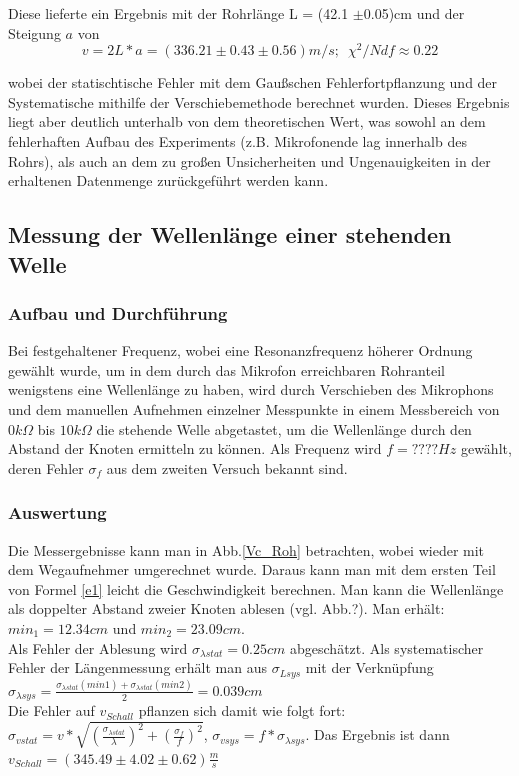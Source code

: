 \documentclass[]{article}
\begin{document}
	Diese lieferte ein Ergebnis mit der Rohrlänge L = (42.1 $\pm$0.05)cm und der Steigung $a$ von 
	\begin{equation}
		v = 2L*a = (336.21 \pm 0.43 \pm 0.56) m/s; \, \, \, \chi^2/Ndf \approx 0.22
	\end{equation}
	
	wobei der statischtische Fehler mit dem Gaußschen Fehlerfortpflanzung und der Systematische mithilfe der Verschiebemethode berechnet wurden. Dieses Ergebnis liegt aber deutlich unterhalb von dem theoretischen Wert, was sowohl an dem fehlerhaften Aufbau des Experiments (z.B. Mikrofonende lag innerhalb des Rohrs), als auch an dem zu großen Unsicherheiten und Ungenauigkeiten in der erhaltenen Datenmenge zurückgeführt werden kann.
	
	\subsection{Messung der Wellenlänge einer stehenden Welle}
	\subsubsection{Aufbau und Durchführung}
	Bei festgehaltener Frequenz, wobei eine Resonanzfrequenz höherer Ordnung gewählt wurde, um in dem durch das Mikrofon erreichbaren Rohranteil wenigstens eine Wellenlänge zu haben, wird durch Verschieben des Mikrophons und dem manuellen Aufnehmen einzelner Messpunkte in einem Messbereich von $0k\Omega$ bis $10k\Omega$ die stehende Welle abgetastet, um die Wellenlänge durch den Abstand der Knoten ermitteln zu können. Als Frequenz wird $f=????Hz$ gewählt, deren Fehler $\sigma_f$ aus dem zweiten Versuch bekannt sind.
	\subsubsection{Auswertung}
	
	Die Messergebnisse kann man in Abb.\ref{Vc_Roh} betrachten, wobei wieder mit dem Wegaufnehmer umgerechnet wurde. Daraus kann man mit dem ersten Teil von Formel \ref{e1} leicht die Geschwindigkeit berechnen. Man kann die Wellenlänge als doppelter Abstand zweier Knoten ablesen (vgl. Abb.?). Man erhält: $min_1=12.34cm$ und $min_2=23.09cm$.\\ 
	 Als Fehler der Ablesung wird $\sigma_{\lambda stat}=0.25cm$ abgeschätzt. Als systematischer Fehler der Längenmessung erhält man aus $\sigma_{Lsys}$ mit der Verknüpfung $\sigma_{\lambda sys} = \frac{\sigma_{\lambda stat}(min1)+\sigma_{\lambda stat}(min2)}{2}=0.039cm$\\
	 Die Fehler auf $v_{Schall}$ pflanzen sich damit wie folgt fort: $\sigma_{vstat}=v*\sqrt{(\frac{\sigma_{\lambda stat}}{\lambda})^2+(\frac{\sigma_f}{f})^2}$, 
	 $\sigma_{vsys}=f*\sigma_{\lambda sys}$.
	 Das Ergebnis ist dann $v_{Schall}=(345.49 \pm 4.02 \pm 0.62)\frac{m}{s}$
\end{document}
